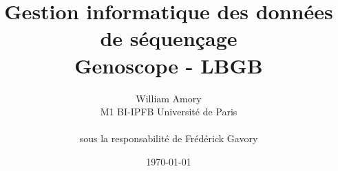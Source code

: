 
\title{Gestion informatique des données de séquençage \\ Genoscope - LBGB}
\author{William Amory \\ M1 BI-IPFB Université de Paris \\\\ sous la responsabilité de Frédérick Gavory}
\date{\today}



{\hypersetup{hidelinks}
    \tableofcontents}
\newpage



\newpage
{}
\theendnotes
\newpage
{}


\nocite{*}


